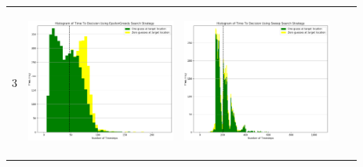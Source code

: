\begin{landscape}
\begin{table}[h!]
\begin{tabular}{ | c | c | c | c | c |}
    3 & 
    \begin{minipage}[c][52mm][c]{49mm}
      \includegraphics[width=49mm, height=49mm]{Chapters/MultiAgentTargetDetection/Figs/Histograms/MultipleAgent/3/SingleAgentSingleSource3EpsilonGreedyHistogram.png}
    \end{minipage}
    &
    \begin{minipage}[c][52mm][c]{49mm}
      \includegraphics[width=49mm, height=49mm]{Chapters/MultiAgentTargetDetection/Figs/Histograms/MultipleAgent/3/SingleAgentSingleSource3SweepHistogram.png}


\end{minipage}
\end{tabular}
\end{table}
\end{landscape}
